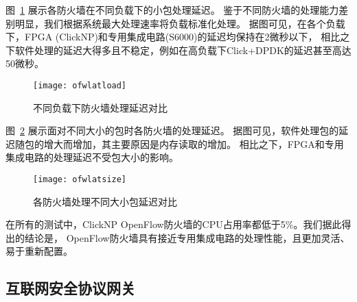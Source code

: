 图~\ref{fig:ofwlatload} 展示各防火墙在不同负载下的小包处理延迟。
鉴于不同防火墙的处理能力差别明显，我们根据系统最大处理速率将负载标准化处理。
据图可见，在各个负载下，FPGA (ClickNP)和专用集成电路(S6000)的延迟均保持在2微秒以下，
相比之下软件处理的延迟大得多且不稳定，例如在高负载下Click+DPDK的延迟甚至高达50微秒。
\begin{figure}[ht]
\centering
\texttt{[image: ofwlatload]}
\caption{不同负载下防火墙处理延迟对比} \label{fig:ofwlatload}
\end{figure}

图~\ref{fig:ofwlatsize} 展示面对不同大小的包时各防火墙的处理延迟。
据图可见，软件处理包的延迟随包的增大而增加，其主要原因是内存读取的增加。
相比之下，FPGA和专用集成电路的处理延迟不受包大小的影响。
\begin{figure}[ht]
\centering
\texttt{[image: ofwlatsize]}
\caption{各防火墙处理不同大小包延迟对比} \label{fig:ofwlatsize}
\end{figure}

在所有的测试中，ClickNP OpenFlow防火墙的CPU占用率都低于5\%。我们据此得出的结论是，
OpenFlow防火墙具有接近专用集成电路的处理性能，且更加灵活、易于重新配置。

\subsection{互联网安全协议网关}

